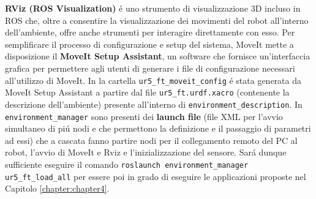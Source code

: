 \textbf{RViz (ROS Visualization)} \'{e} uno strumento di visualizzazione 3D incluso in ROS che, oltre a consentire la visualizzazione 
dei movimenti del robot all'interno dell'ambiente, offre anche strumenti per interagire direttamente con esso.  
Per semplificare il processo di configurazione e setup del sistema, MoveIt mette a disposizione il \textbf{MoveIt Setup Assistant},  
un software che fornisce un'interfaccia grafica per permettere agli utenti di generare i file di configurazione necessari 
all'utilizzo di MoveIt. 
In \cite{environment_setup} la cartella \verb|ur5_ft_moveit_config| \'{e} stata generata da MoveIt Setup Assistant a partire 
dal file \verb|ur5_ft.urdf.xacro| (contenente la descrizione dell'ambiente) presente all'interno di \verb|environment_description|. 
In \verb|environment_manager| sono presenti dei \textbf{launch file} (file XML per l'avvio simultaneo di pi\'{u} nodi e che 
permettono la definizione e il passaggio di parametri ad essi) che a cascata fanno partire nodi per il collegamento remoto del 
PC al robot, l'avvio di MoveIt e Rviz e l'inizializzazione del sensore. 
Sar\'{a} dunque sufficiente eseguire il comando \verb|roslaunch environment_manager ur5_ft_load_all| per essere poi in grado di 
eseguire le applicazioni proposte nel Capitolo \ref{chapter:chapter4}.